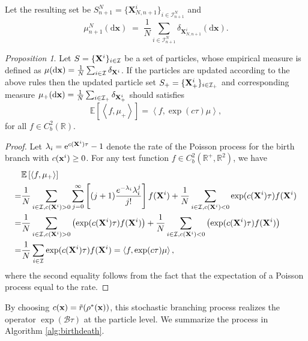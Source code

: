 \documentclass[preprint,12pt]{elsarticle}
\theoremstyle{definition}
\theoremstyle{remark}
\newtheorem{proposition}{Proposition}
\begin{document}
Let the resulting set be \(S_{n+1}^N=\{\mathbf X^i_{N,n+1}\}_{i\in\mathcal I_{n+1}^N}\) and
\[
\mu_{n+1}^{N}(\mathrm{d}\mathbf{x})
\;=\;
\frac{1}{N}\sum_{i\in\mathcal I_{n+1}^N}\delta_{\mathbf X^i_{N,n+1}}(\mathrm{d}\mathbf{x}).
\]


\begin{proposition}
    Let $S=\{\mathbf{X}^i\}_{i\in \mathcal I}$ be a set of particles, whose empirical measure is defined as $\mu (\mathrm{d} \mathbf{x}) = \frac{1}{N}\sum_{i\in \mathcal I }\delta_{\mathbf{X}^i}$. If the particles are updated according to the above rules then the updated particle set $S_+=\{ \mathbf{X}^i_+\}_{i\in {\mathcal I}_+}$ and corresponding  measure $ \mu_+ (\mathrm{d} \mathbf{x}) = \frac{1}{N}\sum_{i\in  {\mathcal  I}_+}\delta_{ \mathbf{X}^i_+}$ should satisfies 
    \begin{equation}
        \mathbb E [\left<f, \mu_+\right>] =   \left<f,\exp( c\tau)\mu\right>,
    \end{equation}
    for all $f\in C^2_b(\mathbb R)$.
\label{prop:stochastic_branch}
\end{proposition}

\begin{proof} Let $\lambda_i = {\rm e}^{c(\mathbf X^i) \tau} -1 $ denote the  rate of the Poisson process for the birth branch with $c(\mathbf x^i) \ge 0$. For any test function $f\in C^2_b(\mathbb R^+, \mathbb R^2)$, we have
\begin{equation}
\begin{aligned}
     & \mathbb E\left[\left<f,  \mu_+\right>\right]
    \\=& \frac{1}{N} \sum_{i\in \mathcal I ,c(\mathbf{X}^i)>0} \sum_{j=0}^{\infty} 
    \left[(j+1) \frac{e^{-\lambda_i} \lambda_i^j}{j!}\right] f(\mathbf{X}^i)
     + \frac{1}{N} \sum_{i\in \mathcal I , c(\mathbf{X}^i)<0}
    \exp( c(\mathbf{X}^i)\tau)f(\mathbf{X}^i) \\
    =& \frac{1}{N}\sum_{i\in \mathcal I ,c(\mathbf{X}^i)>0} 
    \left(
    \exp(c(\mathbf{X}^i)\tau)f(\mathbf{X}^i)
    \right) 
     + \frac{1}{N}\sum_{i\in \mathcal I , c(\mathbf{X}^i)<0}\left(
    \exp( c(\mathbf{X}^i)\tau)f(\mathbf{X}^i) \right)\\
    = & \frac{1}{N}\sum_{i\in \mathcal I}\exp( c(\mathbf{X}^i)\tau)f(\mathbf{X}^i) 
    = \left<f,\exp( c\tau)\mu\right>,
\end{aligned}
\end{equation}
where the second equality follows from the fact that the expectation of a Poisson process equal to the rate.
\end{proof}
By choosing $c(\mathbf x) = \tilde{r}(\rho^{\ast}(\mathbf x))$, this stochastic branching process realizes the operator $\exp(\mathcal{B}\tau)$ at the particle level. We summarize the process in Algorithm \ref{alg:birthdeath}.
\end{document}
